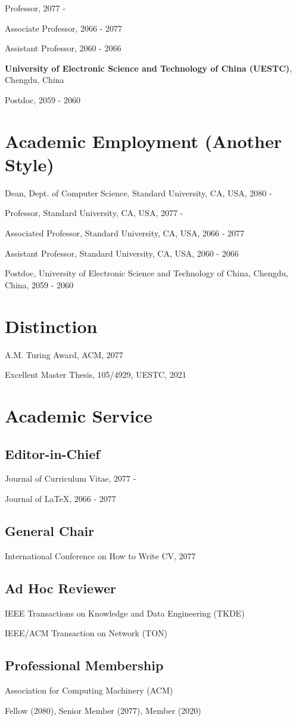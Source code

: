 \documentclass{article}
\newcommand{\cvsection}[1]{\section*{\rmfamily#1}}
\newcommand{\cvsubsection}[1]{\subsection*{\rmfamily\hspace{1.6em}#1}}
\begin{document}
\hspace{2em}Professor, 2077 - 

\hspace{2em}Associate Professor, 2066 - 2077

\hspace{2em}Assistant Professor, 2060 - 2066

\textbf{University of Electronic Science and Technology of China (UESTC)}, Chengdu, China

\hspace{2em}Postdoc, 2059 - 2060


\cvsection{Academic Employment (Another Style)}
\indent

Dean, Dept. of Computer Science, Standard University, CA, USA, 2080 -

Professor, Standard University, CA, USA, 2077 -

Associated Professor, Standard University, CA, USA, 2066 - 2077

Assistant Professor, Standard University, CA, USA, 2060 - 2066

Postdoc, University of Electronic Science and Technology of China, Chengdu, China, 2059 - 2060




\cvsection{Distinction}
\indent

A.M. Turing Award, ACM, 2077

Excellent Master Thesis, 105/4929, UESTC, 2021


\cvsection{Academic Service}

\cvsubsection{Editor-in-Chief}
\indent

Journal of Curriculum Vitae, 2077 -

Journal of \LaTeX, 2066 - 2077

\cvsubsection{General Chair}
\indent

International Conference on How to Write CV, 2077

\cvsubsection{Ad Hoc Reviewer}
\indent

IEEE Transactions on Knowledge and Data Engineering (TKDE)

IEEE/ACM Transaction on Network (TON)

\cvsubsection{Professional Membership}
\indent

Association for Computing Machinery (ACM)

\hspace{2em}Fellow (2080), Senior Member (2077), Member (2020)
\end{document}
